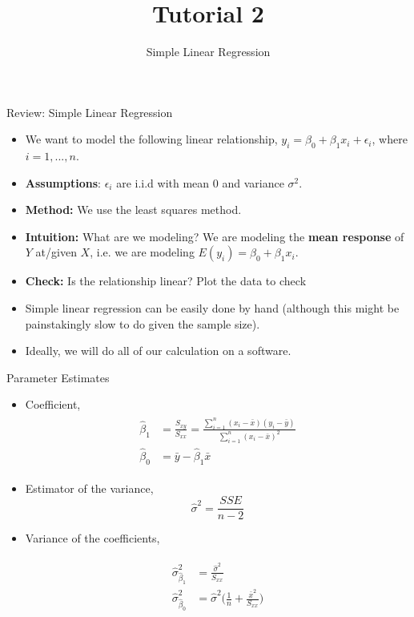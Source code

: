 \documentclass{beamer}
\title{Tutorial 2}
\subtitle{Simple Linear Regression}
\begin{document}
	\frame {
		\titlepage
	}
	
	
	\begin{frame}{Review: Simple Linear Regression}
		\begin{itemize}
			\item We want to model the following linear relationship, $y_i=\beta_0+\beta_1x_i+\epsilon_i$, where $i=1,...,n$.
			\item \textbf{Assumptions}: $\epsilon_i$ are i.i.d with mean $0$ and variance $\sigma^2$.
			\item \textbf{Method:} We use the least squares method.
			\item \textbf{Intuition:} What are we modeling? We are modeling the \textbf{mean response} of $Y$ at/given $X$, i.e. we are modeling $E(y_i)=\beta_0+\beta_1x_i$.
			\item \textbf{Check:} Is the relationship linear? Plot the data to check
			\item Simple linear regression can be easily done by hand (although this might be painstakingly slow to do given the sample size).
			\item Ideally, we will do all of our calculation on a software.
		\end{itemize}
	\end{frame}
	
	
	\begin{frame}{Parameter Estimates}
		\begin{itemize}
			\item Coefficient,
			\begin{align*}
				\begin{split}
					\hat{\beta}_1 &= \frac{S_{xy}}{S_{xx}}=\frac{\sum^n_{i=1} (x_i-\bar{x})(y_i-\bar{y})}{ \sum^n_{i=1}  (x_i-\bar{x})^2}\\
					\hat{\beta}_0 &= \bar{y}-\hat{\beta}_1\bar{x} 
				\end{split}
			\end{align*}
			
			\item Estimator of the variance, $$\hat{\sigma}^2=\frac{SSE}{n-2}$$
			
			
			\item Variance of the coefficients,
			
			\begin{align*}
				\begin{split}
					\hat{\sigma}^2_{\hat{\beta}_1} &= \frac{\hat{\sigma}^2}{S_{xx}}\\
					\hat{\sigma}^2_{\hat{\beta}_0} &= \hat{\sigma}^2 \Big(\frac{1}{n}+\frac{\bar{x}^2}{S_{xx}}\Big)
				\end{split}
			\end{align*}
			
			
		\end{itemize}
	\end{frame}
	
\end{document}
